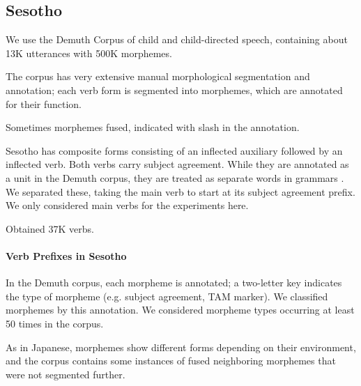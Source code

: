 




\subsection{Sesotho}

\cite{doke1967textbook}

We use the Demuth Corpus \cite{demuth1992acquisition} of child and child-directed speech, containing about 13K utterances with 500K morphemes.

The corpus has very extensive manual morphological segmentation and annotation; each verb form is segmented into morphemes, which are annotated for their function.

Sometimes morphemes fused, indicated with slash in the annotation.

Sesotho has composite forms consisting of an inflected auxiliary followed by an inflected verb.
Both verbs carry subject agreement.
While they are annotated as a unit in the Demuth corpus, they are treated as separate words in grammars \citep{doke1967textbook,guma1971outline,lombard1969handbook}.
We separated these, taking the main verb to start at its subject agreement prefix.
We only considered main verbs for the experiments here.


Obtained 37K verbs.


\paragraph{Verb Prefixes in Sesotho}

In the Demuth corpus, each morpheme is annotated; a two-letter key indicates the type of morpheme (e.g. subject agreement, TAM marker).
We classified morphemes by this annotation.
We considered morpheme types occurring at least 50 times in the corpus.

As in Japanese, morphemes show different forms depending on their environment, and the corpus contains some instances of fused neighboring morphemes that were not segmented further.

